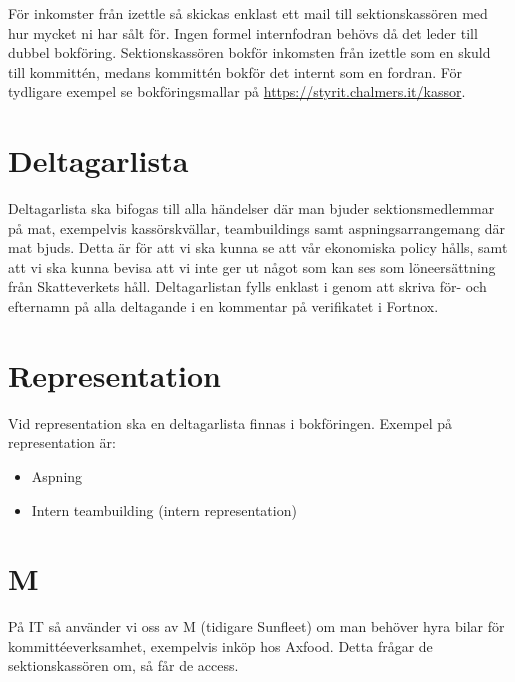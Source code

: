\documentclass{article}
\begin{document}
För inkomster från izettle så skickas enklast ett mail till sektionskassören med hur mycket ni har sålt för. Ingen formel internfodran behövs då det leder till dubbel bokföring. Sektionskassören bokför inkomsten från izettle som en skuld till kommittén, medans kommittén bokför det internt som en fordran. För tydligare exempel se bokföringsmallar på \url{https://styrit.chalmers.it/kassor}.

\section{Deltagarlista}
Deltagarlista ska bifogas till alla händelser där man bjuder sektionsmedlemmar på mat, exempelvis kassörskvällar, teambuildings samt aspningsarrangemang där mat bjuds. Detta är för att vi ska kunna se att vår ekonomiska policy hålls, samt att vi ska kunna bevisa att vi inte ger ut något som kan ses som löneersättning från Skatteverkets håll. Deltagarlistan fylls enklast i genom att skriva för- och efternamn på alla deltagande i en kommentar på verifikatet i Fortnox.


\section{Representation}
Vid representation ska en deltagarlista finnas i bokföringen. Exempel på representation är:
\begin{itemize}
    \item Aspning
    \item Intern teambuilding (intern representation)
\end{itemize}

\section{M}
\label{sec:sunfleet}
På IT så använder vi oss av M (tidigare Sunfleet) om man behöver hyra bilar för kommittéeverksamhet, exempelvis inköp hos Axfood. Detta frågar de sektionskassören om, så får de access. 
\end{document}
